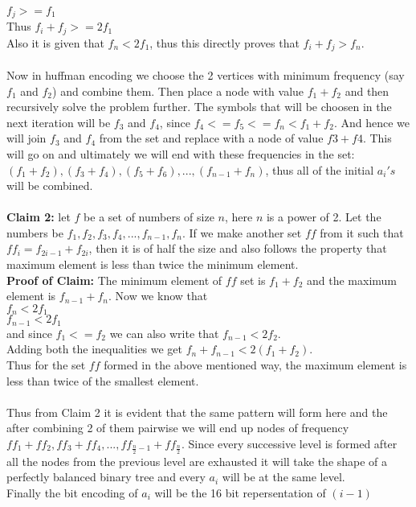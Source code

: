 \documentclass{article}
\begin{document}
$f_j >= f_1$\\
Thus $f_i+f_j >= 2f_1$\\ 
Also it is given that $f_n < 2f_1$, thus this directly proves that $f_i+ f_j > f_n$.
\\\\
Now in huffman encoding we choose the 2 vertices with minimum frequency (say $f_1$ and $f_2$) and combine them. Then place a node with value $f_1+f_2$ and then recursively solve the problem further. The symbols that will be choosen in the next iteration will be $f_3$ and $f_4$, since $f_4<= f_5<= f_n < f_1+ f_2$. And hence we will join $f_3$ and $f_4$ from the set and replace with a node of value $f3+f4$. This will go on and ultimately we will end with these frequencies in the set: $(f_1+f_2), (f_3+f_4), (f_5+f_6), ... ,(f_{n-1}+f_n)$, thus all of the initial $a_i's$ will be combined.
\\\\
\textbf{Claim 2:} let $f$ be a set of numbers of size $n$, here $n$ is a power of 2. Let the numbers be $f_1, f_2, f_3, f_4, ... ,f_{n-1}, f_n$. If we make another set $ff$ from it such that ${ff}_i = f_{2i-1} + f_{2i}$, then it is of half the size and also follows the property that maximum element is less than twice the minimum element. 
\\
\textbf{Proof of Claim:} The minimum element of $ff$ set is $f_1+f_2$ and the maximum element is $f_{n-1}+f_n$. Now we know that\\ 
$f_n < 2f_1$\\
$f_{n-1} < 2f_1$\\
and since $f_1 <= f_2$ we can also write that $f_{n-1} < 2f_2$.\\
Adding both the inequalities we get $f_n + f_{n-1} < 2(f_1+ f_2)$.\\
Thus for the set $ff$ formed in the above mentioned way, the maximum element is less than twice of the smallest element. 
\\\\
Thus from Claim 2 it is evident that the same pattern will form here and the after combining 2 of them pairwise we will end up nodes of frequency $ff_1+ff_2, ff_3+ff_4, ... , ff_{\frac{n}{2}-1}+ff_{\frac{n}{2}}$. Since every successive level is formed after all the nodes from the previous level are exhausted it will take the shape of a perfectly balanced binary tree and every $a_i$ will be at the same level.\\Finally the bit encoding of $a_i$ will be the 16 bit repersentation of $(i-1)$
\end{document}
